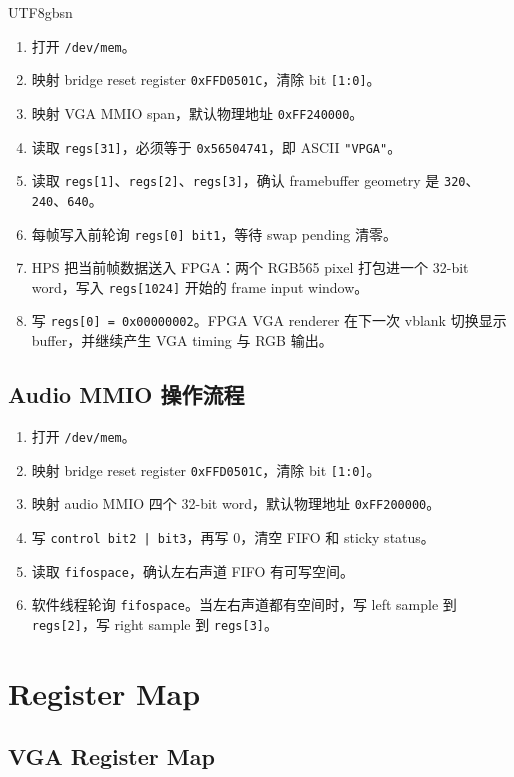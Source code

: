 \documentclass[12pt,a4paper]{article}
\begin{document}
\begin{CJK*}{UTF8}{gbsn}
\begin{enumerate}
  \item 打开 \texttt{/dev/mem}。
  \item 映射 bridge reset register \texttt{0xFFD0501C}，清除 bit \texttt{[1:0]}。
  \item 映射 VGA MMIO span，默认物理地址 \texttt{0xFF240000}。
  \item 读取 \texttt{regs[31]}，必须等于 \texttt{0x56504741}，即 ASCII \texttt{"VPGA"}。
  \item 读取 \texttt{regs[1]}、\texttt{regs[2]}、\texttt{regs[3]}，确认 framebuffer geometry 是 \texttt{320}、\texttt{240}、\texttt{640}。
  \item 每帧写入前轮询 \texttt{regs[0] bit1}，等待 swap pending 清零。
  \item HPS 把当前帧数据送入 FPGA：两个 RGB565 pixel 打包进一个 32-bit word，写入 \texttt{regs[1024]} 开始的 frame input window。
  \item 写 \texttt{regs[0] = 0x00000002}。FPGA VGA renderer 在下一次 vblank 切换显示 buffer，并继续产生 VGA timing 与 RGB 输出。
\end{enumerate}

\subsection{Audio MMIO 操作流程}

\begin{enumerate}
  \item 打开 \texttt{/dev/mem}。
  \item 映射 bridge reset register \texttt{0xFFD0501C}，清除 bit \texttt{[1:0]}。
  \item 映射 audio MMIO 四个 32-bit word，默认物理地址 \texttt{0xFF200000}。
  \item 写 \texttt{control bit2 | bit3}，再写 0，清空 FIFO 和 sticky status。
  \item 读取 \texttt{fifospace}，确认左右声道 FIFO 有可写空间。
  \item 软件线程轮询 \texttt{fifospace}。当左右声道都有空间时，写 left sample 到 \texttt{regs[2]}，写 right sample 到 \texttt{regs[3]}。
\end{enumerate}

\section{Register Map}

\subsection{VGA Register Map}


\end{CJK*}
\end{document}
